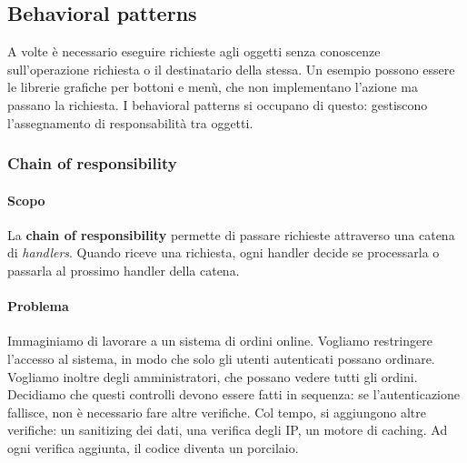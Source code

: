 \documentclass[11pt]{article}
\begin{document}
\subsection{Behavioral patterns}
A volte è necessario eseguire richieste agli oggetti senza conoscenze sull'operazione richiesta o il destinatario della stessa. Un esempio possono essere le librerie grafiche per bottoni e menù, che non implementano l'azione ma passano la richiesta. I behavioral patterns si occupano di questo: gestiscono l'assegnamento di responsabilità tra oggetti.
\subsubsection{Chain of responsibility}
\paragraph{Scopo}
La \textbf{chain of responsibility} permette di passare richieste attraverso una catena di \textit{handlers}. Quando riceve una richiesta, ogni handler decide se processarla o passarla al prossimo handler della catena.
\paragraph{Problema}
Immaginiamo di lavorare a un sistema di ordini online. Vogliamo restringere l'accesso al sistema, in modo che solo gli utenti autenticati possano ordinare. Vogliamo inoltre degli amministratori, che possano vedere tutti gli ordini. Decidiamo che questi controlli devono essere fatti in sequenza: se l'autenticazione fallisce, non è necessario fare altre verifiche. Col tempo, si aggiungono altre verifiche: un sanitizing dei dati, una verifica degli IP, un motore di caching. Ad ogni verifica aggiunta, il codice diventa un porcilaio.
\end{document}
